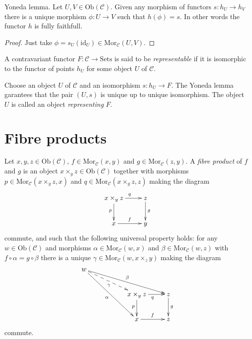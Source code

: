 \begin{lemma}
\label{lemma-yoneda}
Yoneda lemma.
Let $U,V \in \text{Ob}(\mathcal{C})$.
Given any morphism of functors $s : h_U \to h_V$
there is a unique morphism $\phi : U \to V$
such that $h(\phi) = s$. In other words the
functor $h$ is fully faithfull.
\end{lemma}

\begin{proof}
Just take $\phi = s_U(\text{id}_U) \in \text{Mor}_{\mathcal{C}}(U,V)$.
\end{proof}

\begin{definition}
\label{definition-representable-functor}
A contravariant functor $F : \mathcal{C}\to \text{Sets}$ is said
to be {\it representable} if it is isomorphic to the functor of
points $h_U$ for some object $U$ of $\mathcal{C}$.
\end{definition}

\noindent
Choose an object $U$ of $\mathcal{C}$ and an isomorphism $s : h_U \to F$.
The Yoneda lemma garantees that the pair $(U, s)$ 
is unique up to unique isomorphism. The object
$U$ is called an object {\it representing} $F$.

\section{Fibre products}
\label{section-fibre-products}

\begin{definition}
\label{definition-fibre-products}
Let $x,y,z\in \text{Ob}(\mathcal{C})$,
$f\in \text{Mor}_{\mathcal{C}}(x,y)$
and $g\in \text{Mor}_{\mathcal C}(z,y)$.
A {\it fibre product} of $f$ and $g$ is
an object $x\times_y z\in \text{Ob}(\mathcal{C})$
together with morphisms 
$p\in \text{Mor}_{\mathcal C}(x\times_y z,x)$ and 
$q\in\text{Mor}_{\mathcal C}(x\times_y z,z)$ making the diagram
$$
\xymatrix{
x\times_y z \ar[r]^{q} \ar[d]_{p}
&
z \ar[d]^{g}
\\
x \ar[r]^{f}
&
y
}
$$
commute, and such that the following universal property holds: for
any $w\in \text{Ob}(\mathcal{C})$ and morphisms 
$\alpha \in \text{Mor}_{\mathcal C}(w,x)$ and 
$\beta \in \text{Mor}_{\mathcal{C}}(w,z)$ with
$f \circ \alpha= g\circ \beta$
there is a unique
$\gamma\in \text{Mor}_{\mathcal C}(w,x\times_z y)$ making
the diagram
$$
\xymatrix{
w \ar[rrrd]^\beta \ar@{-->}[rrd]_\gamma \ar[rrdd]_\alpha
&
&
\\
&
&
x\times_y z \ar[d]_{p} \ar[r]_{q}
&
z \ar[d]^{g}
\\
&
&
x \ar[r]^{f}
&
z
}
$$
commute.
\end{definition}

